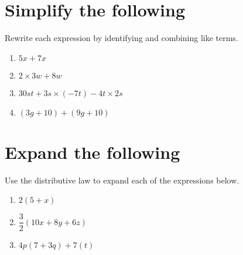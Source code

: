\documentclass[12pt,letterpaper]{article}
\begin{document}
\section*{Simplify the following}
Rewrite each expression by identifying and combining like terms.
\begin{enumerate}

\item $5x + 7x$

\addvspace{0.7in}

\item $2 \times 3w + 8w$

\addvspace{0.7in}

\item $30st + 3s \times (-7t) - 4t \times 2s$

\addvspace{0.7in}

\item $(3g + 10) + (9g + 10)$

\addvspace{0.7in}
\end{enumerate}

\section*{Expand the following}
Use the distributive law to expand each of the expressions below.
\begin{enumerate}
\item $2(5 + x)$

\addvspace{0.7in}

\item $\dfrac{3}{2}(10x +8y + 6z)$

\addvspace{0.7in}


\addvspace{0.7in}

\item $4p(7 + 3q) + 7(t)$

\addvspace{1in}
\end{enumerate}
\end{document}
